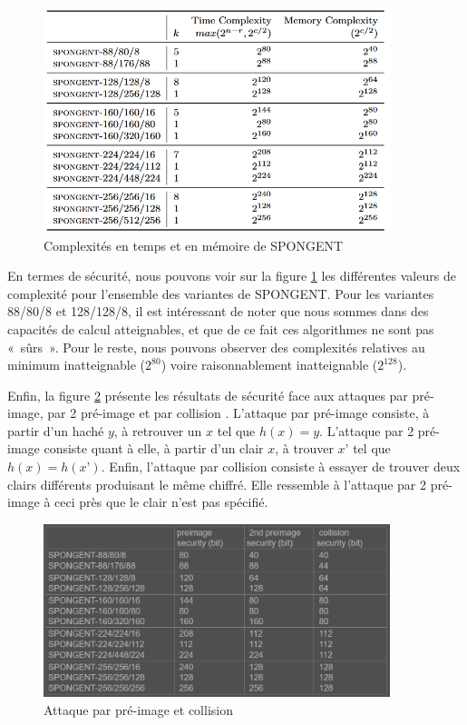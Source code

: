 		\begin{figure}[!h]
			\centering
			\includegraphics[width=0.9\textwidth]{imgs/Spongent/timeComplexity.png}
			\caption{Complexités en temps et en mémoire de SPONGENT}
			\label{timeComplexity}
		\end{figure}

		En termes de sécurité, nous pouvons voir sur la figure \ref{timeComplexity} les différentes valeurs de complexité pour l’ensemble des variantes de SPONGENT.
		Pour les variantes 88/80/8 et 128/128/8, il est intéressant de noter que nous sommes dans des capacités de calcul atteignables, et que de ce fait ces algorithmes ne sont pas « sûrs ».
		Pour le reste, nous pouvons observer des complexités relatives au minimum inatteignable ($2^{80}$) voire raisonnablement inatteignable ($2^{128}$).

		Enfin, la figure \ref{attaquePreImage} présente les résultats de sécurité face aux attaques par pré-image, par 2 pré-image et par collision \cite{googleSpongent}.
		L’attaque par pré-image consiste, à partir d’un haché $y$, à retrouver un $x$ tel que $h(x) = y$.
		L’attaque par 2 pré-image consiste quant à elle, à partir d’un clair $x$, à trouver $x’$ tel que $h(x) = h(x’)$.
		Enfin, l’attaque par collision consiste à essayer de trouver deux clairs différents produisant le même chiffré.
		Elle ressemble à l’attaque par 2 pré-image à ceci près que le clair n’est pas spécifié.

		\begin{figure}[!h]
			\centering
			\includegraphics[width=0.9\textwidth, height=0.3\textheight]{imgs/Spongent/attaquePreImage.png}
			\caption{Attaque par pré-image et collision}
			\label{attaquePreImage}
		\end{figure}

